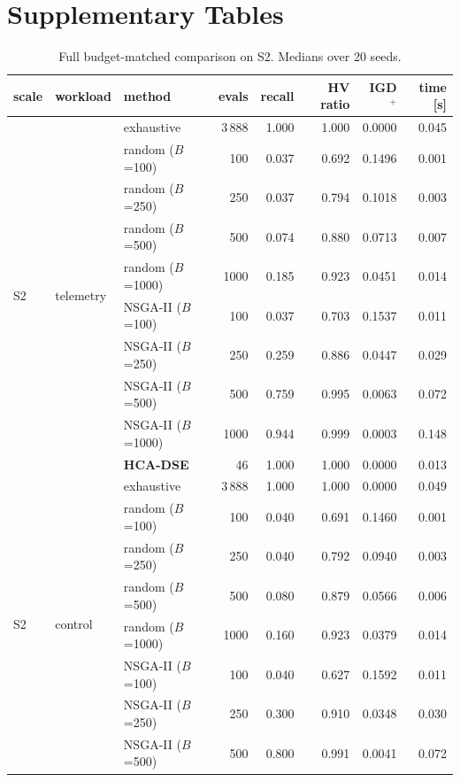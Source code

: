 \documentclass[pdflatex,sn-nature]{sn-jnl}
\theoremstyle{thmstyleone}
\theoremstyle{thmstyletwo}
\theoremstyle{thmstylethree}
\begin{document}
\section{Supplementary Tables}\label{stables}

\begin{table}[!htbp]\centering
\caption{Full budget-matched comparison on S2. Medians over 20 seeds.}\label{tabS1}
{\let\scriptsize\tiny\setlength{\tabcolsep}{2pt}\scriptsize
\begin{tabular}{lllrrrrr}
\toprule
scale & workload & method & evals & recall & HV ratio & IGD$^{+}$ & time [s] \\
\midrule
\multirow{10}{*}{S2} & \multirow{10}{*}{telemetry} & exhaustive & 3\,888 & 1.000 & 1.000 & 0.0000 & 0.045 \\
 & & random ($B$=100) & 100 & 0.037 & 0.692 & 0.1496 & 0.001 \\
 & & random ($B$=250) & 250 & 0.037 & 0.794 & 0.1018 & 0.003 \\
 & & random ($B$=500) & 500 & 0.074 & 0.880 & 0.0713 & 0.007 \\
 & & random ($B$=1000) & 1000 & 0.185 & 0.923 & 0.0451 & 0.014 \\
 & & NSGA-II ($B$=100) & 100 & 0.037 & 0.703 & 0.1537 & 0.011 \\
 & & NSGA-II ($B$=250) & 250 & 0.259 & 0.886 & 0.0447 & 0.029 \\
 & & NSGA-II ($B$=500) & 500 & 0.759 & 0.995 & 0.0063 & 0.072 \\
 & & NSGA-II ($B$=1000) & 1000 & 0.944 & 0.999 & 0.0003 & 0.148 \\
 & & \textbf{HCA-DSE} & 46 & 1.000 & 1.000 & 0.0000 & 0.013 \\
\midrule
\multirow{10}{*}{S2} & \multirow{10}{*}{control} & exhaustive & 3\,888 & 1.000 & 1.000 & 0.0000 & 0.049 \\
 & & random ($B$=100) & 100 & 0.040 & 0.691 & 0.1460 & 0.001 \\
 & & random ($B$=250) & 250 & 0.040 & 0.792 & 0.0940 & 0.003 \\
 & & random ($B$=500) & 500 & 0.080 & 0.879 & 0.0566 & 0.006 \\
 & & random ($B$=1000) & 1000 & 0.160 & 0.923 & 0.0379 & 0.014 \\
 & & NSGA-II ($B$=100) & 100 & 0.040 & 0.627 & 0.1592 & 0.011 \\
 & & NSGA-II ($B$=250) & 250 & 0.300 & 0.910 & 0.0348 & 0.030 \\
 & & NSGA-II ($B$=500) & 500 & 0.800 & 0.991 & 0.0041 & 0.072 \\

\end{tabular}}
\end{table}
\end{document}

